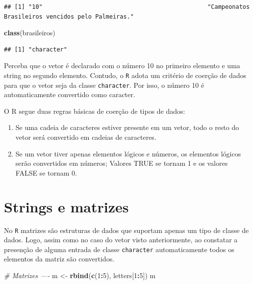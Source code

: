 \documentclass[]{book}
\newenvironment{Shaded}{\begin{snugshade}}{\end{snugshade}}
\newcommand{\CommentTok}[1]{\textcolor[rgb]{0.56,0.35,0.01}{\textit{#1}}}
\newcommand{\DecValTok}[1]{\textcolor[rgb]{0.00,0.00,0.81}{#1}}
\newcommand{\KeywordTok}[1]{\textcolor[rgb]{0.13,0.29,0.53}{\textbf{#1}}}
\newcommand{\NormalTok}[1]{#1}
\newcommand{\OperatorTok}[1]{\textcolor[rgb]{0.81,0.36,0.00}{\textbf{#1}}}
\newcommand{\StringTok}[1]{\textcolor[rgb]{0.31,0.60,0.02}{#1}}
\begin{document}
\begin{verbatim}
## [1] "10"                                               "Campeonatos Brasileiros vencidos pelo Palmeiras."
\end{verbatim}

\begin{Shaded}
\begin{Highlighting}[]
\KeywordTok{class}\NormalTok{(brasileiros)}
\end{Highlighting}
\end{Shaded}

\begin{verbatim}
## [1] "character"
\end{verbatim}

Perceba que o vetor é declarado com o número 10 no primeiro elemento e uma string no segundo elemento. Contudo, o \texttt{R} adota um critério de coerção de dados para que o vetor seja da classe \texttt{character}. Por isso, o número 10 é automaticamente convertido como caracter.

O R segue duas regras básicas de coerção de tipos de dados:

\begin{enumerate}
\def\labelenumi{\arabic{enumi}.}
\item
  Se uma cadeia de caracteres estiver presente em um vetor, todo o resto do vetor será convertido em cadeias de caracteres.
\item
  Se um vetor tiver apenas elementos lógicos e números, os elementos lógicos serão convertidos em números; Valores TRUE se tornam 1 e os valores FALSE se tornam 0.
\end{enumerate}

\hypertarget{strings-e-matrizes}{%
\section{Strings e matrizes}\label{strings-e-matrizes}}

No \texttt{R} matrizes são estruturas de dados que suportam apenas um tipo de classe de dados. Logo, assim como no caso do vetor visto anteriormente, ao constatar a presenção de alguma entrada de classe \texttt{character} automaticamente todos os elementos da matriz são convertidos.

\begin{Shaded}
\begin{Highlighting}[]
\CommentTok{# Matrizes ----}
\NormalTok{m <-}\StringTok{ }\KeywordTok{rbind}\NormalTok{(}\KeywordTok{c}\NormalTok{(}\DecValTok{1}\OperatorTok{:}\DecValTok{5}\NormalTok{), letters[}\DecValTok{1}\OperatorTok{:}\DecValTok{5}\NormalTok{])}
\NormalTok{m}
\end{Highlighting}
\end{Shaded}
\end{document}
